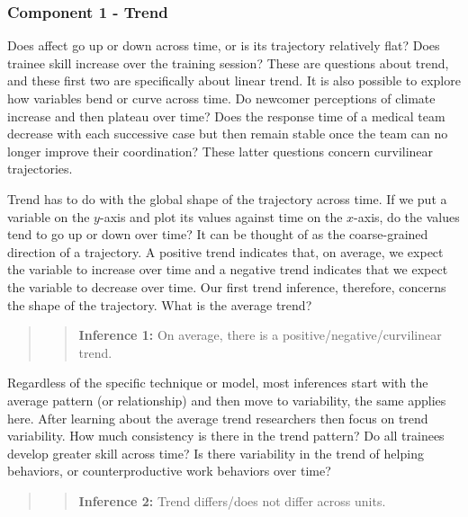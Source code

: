 \documentclass[english,,man]{apa6}
\theoremstyle{definition}
\theoremstyle{definition}
\theoremstyle{definition}
\theoremstyle{remark}
\begin{document}
\hypertarget{component-1---trend}{%
\subsubsection{Component 1 - Trend}\label{component-1---trend}}

Does affect go up or down across time, or is its trajectory relatively
flat? Does trainee skill increase over the training session? These are
questions about trend, and these first two are specifically about linear
trend. It is also possible to explore how variables bend or curve across
time. Do newcomer perceptions of climate increase and then plateau over
time? Does the response time of a medical team decrease with each
successive case but then remain stable once the team can no longer
improve their coordination? These latter questions concern curvilinear
trajectories.

Trend has to do with the global shape of the trajectory across time. If
we put a variable on the \(y\)-axis and plot its values against time on
the \(x\)-axis, do the values tend to go up or down over time? It can be
thought of as the coarse-grained direction of a trajectory. A positive
trend indicates that, on average, we expect the variable to increase
over time and a negative trend indicates that we expect the variable to
decrease over time. Our first trend inference, therefore, concerns the
shape of the trajectory. What is the average trend?

\begin{quote}
\begin{quote}
\textbf{Inference 1:} On average, there is a
positive/negative/curvilinear trend.
\end{quote}
\end{quote}

Regardless of the specific technique or model, most inferences start
with the average pattern (or relationship) and then move to variability,
the same applies here. After learning about the average trend
researchers then focus on trend variability. How much consistency is
there in the trend pattern? Do all trainees develop greater skill across
time? Is there variability in the trend of helping behaviors, or
counterproductive work behaviors over time?

\begin{quote}
\begin{quote}
\textbf{Inference 2:} Trend differs/does not differ across units.
\end{quote}
\end{quote}
\end{document}
